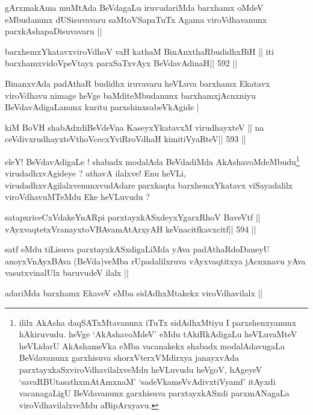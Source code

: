 \begin{artha}
gArxmakAma muMtAda BeVdagaLu iruvudariMda barxhamx oMdeV eMbudanunx
dUSisuvavaru saMtoVSapaTuTx Agama viroVdhavanunx parxkAshapaDisuvavaru
||
\end{artha}



\begin{shl}
barxhemxYkatavxviroVdhoV vaH kathaM BinAnxthaRbudidhxBiH ||
iti barxhamxvidoVpeVtayx parxSaTxvAyx BeVdavAdinaH\hfill || 592 ||
\end{shl}

\begin{artha}
BinanxvAda padAthaR budidhx iruvavaru heVLuva barxhamx Ekatavx
viroVdhavu nimage heVge baMditeMbudanunx barxhamxjAcnxniyu
BeVdavAdigaLanunx kuritu parxshinxsabeVkAgide |
\end{artha}

\begin{shl}
kiM BoVH shabAdxdiBeVdeVna KaseyxYkatavxM virudhayxteV ||
na ceVdivxrudhayxteV\s thoVcecxYviRroVdhaH kimitiVyaRteV\hfill || 593 ||
\end{shl}

\begin{artha}
eleY! BeVdavAdigaLe ! shabadx modalAda BeVdadiMda
AkAshavoMdeMbudu\footnote{ililx AkAsha daqSATxMtavanunx iTuTx
  sidAdhxMtiyu I parxshenxyanunx hAkiruvudu. heVge `AkAshavoMdeV' eMdu
  tAkiRkAdigaLu heVLuvaMteV heVLidarU AkAshameVka eMba vacanakekx
  shabadx modalAdavugaLa BeVdavanunx garxhisuva shorxVterxVMdirxya
  janayxvAda parxtayxkaSxviroVdhavilalxveMdu heVLuvudu heVgoV, hAgeyeV
  `savaRBUtasathxmAtAmxnaM' `sadeVkameVvAdivxtiVyamf' itAyxdi
  vacanagaLigU BeVdavanunx garxhisuva parxtayxkASxdi parxmANagaLa
  viroVdhavilalxveMdu aBipArxyavu.} virudadhxvAgideye ? athavA ilalxve! Enu
heVLi, virudadhxvAgilalxvenunxvudAdare parxkaqta barxhemxYkatavx
viSayadalilx viroVdhavuMTeMdu Eke heVLuvudu ?
\end{artha}

\begin{shl}
satapxriceCxVdakeYnARpi parxtayxkASxdeyxYgarxRhoV BaveVtf ||
vAyxvaqtetxVranayxtoVBAvamAtArxyAH keVnacitfkavxcitf\hfill || 594 ||
\end{shl}

\begin{artha}
satf eMdu tiLisuva parxtayxkASxdigaLiMda yAva padAthaRdoDaneyU
anoyxVnAyxBAva (BeVda)veMba rUpadalilxruva vAyxvaqtitxya jAcnxnavu
yAva vasutxvinalUlx baruvudeV ilalx ||

adariMda barxhamx EkaveV eMba sidAdhxMtakekx viroVdhavilalx ||
\end{artha}

